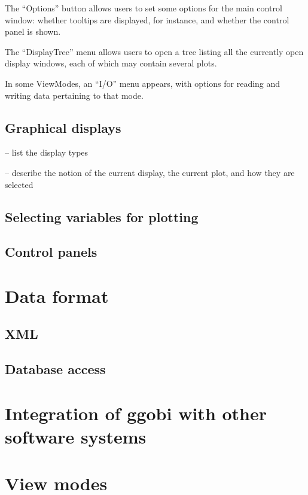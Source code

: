 \documentclass[11pt]{article}
\begin{document}
The ``Options'' button allows users to set some options for the
main control window:  whether tooltips are displayed, for instance,
and whether the control panel is shown.

The ``DisplayTree'' menu allows users to open a tree listing
all the currently open display windows, each of which may contain
several plots.

In some ViewModes, an ``I/O'' menu appears, with options for
reading and writing data pertaining to that mode.

\subsection{Graphical displays}
\label{slbl:GraphicalDisplays}

-- list the display types

-- describe the notion of the current display, the current plot,
and how they are selected

\subsection{Selecting variables for plotting}
\subsection{Control panels}

\section{Data format}
\label{slbl:DataFormat}
\subsection {XML}
\label{slbl:XML}
\subsection {Database access}
\label{slbl:MySQL}

\section{Integration of ggobi with other software systems}
\label{slbl:Integration}

\section{View modes}
\label{slbl:ViewModes}
\end{document}
